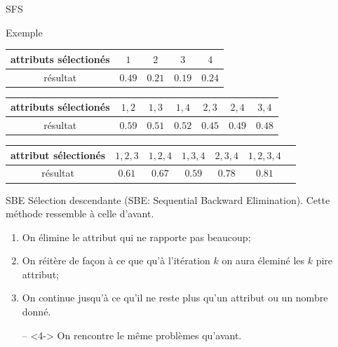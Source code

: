 \documentclass[9pt]{beamer}
\begin{document}
	\begin{frame}{SFS}
		\begin{block}{Exemple}
			\begin{longtable}{c c c c c}
				\toprule
				attributs sélectionés & $1$ & $2$ & $3$ & $4$\\
				\midrule
				résultat& $0.49$ & $0.21$ & $0.19$ &$0.24$\\
				\bottomrule
			\end{longtable}
			\begin{longtable}{c c c c c c c}
				\toprule
				attributs sélectionés & $1,2$ & $1,3$ & $1,4$ & $2,3$ & $2,4$ & $3,4$\\
				\midrule
				résultat & $0.59$ & $0.51$ & $0.52$ & $0.45$ & $0.49$ & $0.48$\\
				\bottomrule
			\end{longtable}
			\begin{longtable}{c c c c c c c}
				\toprule
				attribut sélectionés & $1,2,3$ & $1,2,4$ & $1,3,4$ & $2,3,4$ & $1,2,3,4$\\
				\midrule
				résultat & $0.61$ & $0.67$ & $0.59$ & $0.78$ & $0.81$\\
				\bottomrule
			\end{longtable}
		\end{block}
	\end{frame}

	\begin{frame}{SBE}
		Sélection descendante (SBE\@: Sequential Backward Elimination).
		Cette méthode ressemble à celle d'avant.
		\begin{enumerate}
		\item<1-> On élimine le attribut qui ne rapporte pas beaucoup;
		\item<2-> On réitère de façon à ce que qu'à l'itération $k$ on aura éleminé les $k$ pire attribut;
		\item<3-> On continue jusqu'à ce qu'il ne reste plus qu'un attribut ou un nombre donné.
		\item[--]<4-> On rencontre le même problèmes qu'avant.
		\end{enumerate}
	\end{frame}
\end{document}
